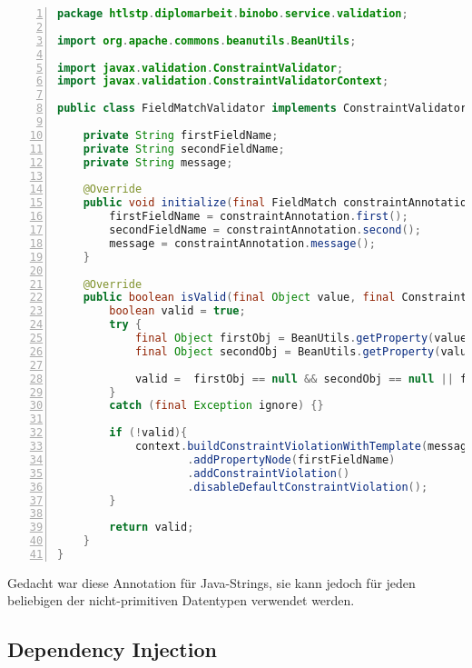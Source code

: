 \documentclass[paper=a4,12pt]{scrreprt}
\begin{document}
\begin{lstlisting}[caption={FieldMatchValidator Klasse}, captionpos=b, label={listing:flield_match}, language=java, numbers=left,
  stepnumber=1]
package htlstp.diplomarbeit.binobo.service.validation;

import org.apache.commons.beanutils.BeanUtils;

import javax.validation.ConstraintValidator;
import javax.validation.ConstraintValidatorContext;

public class FieldMatchValidator implements ConstraintValidator<FieldMatch, Object> {

    private String firstFieldName;
    private String secondFieldName;
    private String message;

    @Override
    public void initialize(final FieldMatch constraintAnnotation) {
        firstFieldName = constraintAnnotation.first();
        secondFieldName = constraintAnnotation.second();
        message = constraintAnnotation.message();
    }

    @Override
    public boolean isValid(final Object value, final ConstraintValidatorContext context) {
        boolean valid = true;
        try {
            final Object firstObj = BeanUtils.getProperty(value, firstFieldName);
            final Object secondObj = BeanUtils.getProperty(value, secondFieldName);

            valid =  firstObj == null && secondObj == null || firstObj != null && firstObj.equals(secondObj);
        }
        catch (final Exception ignore) {}

        if (!valid){
            context.buildConstraintViolationWithTemplate(message)
                    .addPropertyNode(firstFieldName)
                    .addConstraintViolation()
                    .disableDefaultConstraintViolation();
        }

        return valid;
    }
}  
\end{lstlisting}

Gedacht war diese Annotation für Java-Strings, sie kann jedoch für jeden beliebigen der nicht-primitiven Datentypen verwendet werden.\newline


\subsection{Dependency Injection}
\label{sec:depInj}
\end{document}

